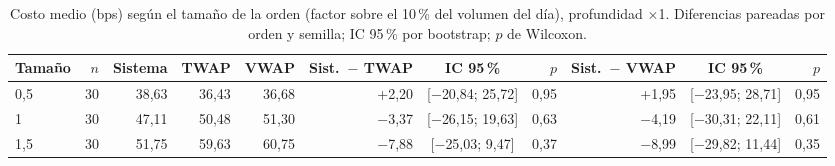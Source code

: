 \begin{table}[htbp]
\centering
\small
\setlength{\tabcolsep}{4pt}
\caption{Costo medio (bps) según el tamaño de la orden (factor sobre el 10\,\% del volumen del día), profundidad $\times$1. Diferencias pareadas por orden y semilla; IC 95\,\% por bootstrap; $p$ de Wilcoxon.}
\label{tab:resultados_tamano}
\begin{tabular}{lrrrrrcrrcr}
\hline
Tamaño & $n$ & Sistema & TWAP & VWAP & Sist.\ $-$ TWAP & IC 95\,\% & $p$ & Sist.\ $-$ VWAP & IC 95\,\% & $p$ \\
\hline
0,5 & 30 & 38,63 & 36,43 & 36,68 & +2,20 & [$-$20,84; 25,72] & 0,95 & +1,95 & [$-$23,95; 28,71] & 0,95 \\
1 & 30 & 47,11 & 50,48 & 51,30 & $-$3,37 & [$-$26,15; 19,63] & 0,63 & $-$4,19 & [$-$30,31; 22,11] & 0,61 \\
1,5 & 30 & 51,75 & 59,63 & 60,75 & $-$7,88 & [$-$25,03; 9,47] & 0,37 & $-$8,99 & [$-$29,82; 11,44] & 0,35 \\
\hline
\end{tabular}
\end{table}
